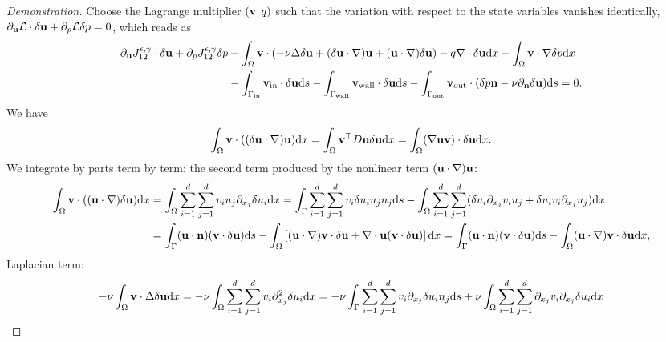 \documentclass[oneside,11pt]{book}
\numberwithin{equation}{section}
\begin{document}
\begin{proof}[Demonstration]
    Choose the Lagrange multiplier $({\bf v},q)$ such that the variation with respect to the state variables vanishes identically, $\partial_{\bf u}\mathcal{L}\cdot\delta{\bf u} + \partial_p\mathcal{L}\delta p = 0$, which reads as
    \begin{align}
        \partial_{\bf u}J_{12}^{\epsilon,\gamma}\cdot\delta{\bf u} + \partial_pJ_{12}^{\epsilon,\gamma}\delta p &- \int_\Omega {\bf v}\cdot\left(- \nu\Delta\delta{\bf u} + (\delta{\bf u}\cdot\nabla){\bf u} + ({\bf u}\cdot\nabla)\delta{\bf u}\right) - q\nabla\cdot\delta{\bf u}{\rm d}x - \int_\Omega {\bf v}\cdot\nabla\delta p{\rm d}x\nonumber\\
        &- \int_{\Gamma_{\rm in}} {\bf v}_{\rm in}\cdot\delta{\bf u}{\rm d}s - \int_{\Gamma_{\rm wall}} {\bf v}_{\rm wall}\cdot\delta{\bf u}{\rm d}s - \int_{\Gamma_{\rm out}} {\bf v}_{\rm out}\cdot(\delta p{\bf n} - \nu\partial_{\bf n}\delta{\bf u}){\rm d}s = 0.\label{1.4.2}
    \end{align}
    We have
    \begin{align*}
        \int_\Omega {\bf v}\cdot((\delta{\bf u}\cdot\nabla){\bf u}){\rm d}x = \int_\Omega {\bf v}^\top D{\bf u}\delta{\bf u}{\rm d}x = \int_\Omega (\nabla{\bf u}{\bf v})\cdot\delta{\bf u}{\rm d}x.
    \end{align*}
    We integrate by parts term by term: the second term produced by the nonlinear term $({\bf u}\cdot\nabla){\bf u}$:
    \begin{align}
        \int_\Omega {\bf v}\cdot(({\bf u}\cdot\nabla)\delta{\bf u}){\rm d}x &= \int_\Omega \sum_{i=1}^d\sum_{j=1}^d v_iu_j\partial_{x_j}\delta u_i{\rm d}x = \int_\Gamma \sum_{i=1}^d\sum_{j=1}^d v_i\delta u_iu_jn_j{\rm d}s - \int_\Omega \sum_{i=1}^d\sum_{j=1}^d (\delta u_i\partial_{x_j}v_iu_j + \delta u_iv_i\partial_{x_j}u_j){\rm d}x\\
        &= \int_\Gamma ({\bf u}\cdot{\bf n})({\bf v}\cdot\delta{\bf u}){\rm d}s - \int_\Omega \left[({\bf u}\cdot\nabla){\bf v}\cdot\delta{\bf u} + \nabla\cdot{\bf u}({\bf v}\cdot\delta{\bf u})\right]{\rm d}x = \int_\Gamma ({\bf u}\cdot{\bf n})({\bf v}\cdot\delta{\bf u}){\rm d}s - \int_\Omega ({\bf u}\cdot\nabla){\bf v}\cdot\delta{\bf u}{\rm d}x,
    \end{align}
    Laplacian term:
    \begin{align}
        -\nu\int_\Omega {\bf v}\cdot\Delta\delta{\bf u}{\rm d}x &= -\nu\int_\Omega \sum_{i=1}^d\sum_{j=1}^d v_i\partial_{x_j}^2\delta u_i{\rm d}x = -\nu\int_\Gamma \sum_{i=1}^d\sum_{j=1}^d v_i\partial_{x_j}\delta u_in_j{\rm d}s + \nu\int_\Omega \sum_{i=1}^d\sum_{j=1}^d \partial_{x_j}v_i\partial_{x_j}\delta u_i{\rm d}x\\

\end{align}
\end{proof}
\end{document}
